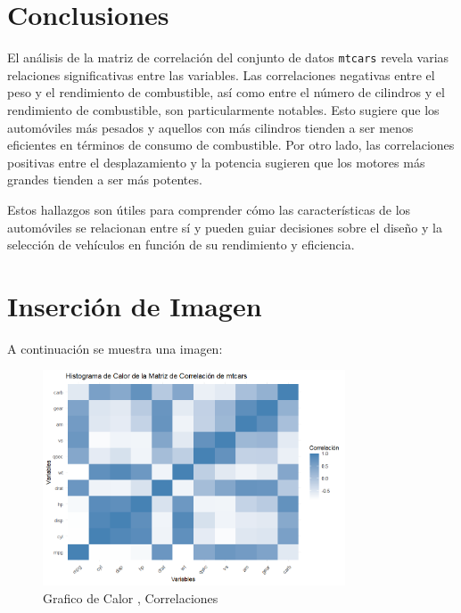 \documentclass{article}
\begin{document}
\section{Conclusiones}
El análisis de la matriz de correlación del conjunto de datos \texttt{mtcars} revela varias relaciones significativas entre las variables. Las correlaciones negativas entre el peso y el rendimiento de combustible, así como entre el número de cilindros y el rendimiento de combustible, son particularmente notables. Esto sugiere que los automóviles más pesados y aquellos con más cilindros tienden a ser menos eficientes en términos de consumo de combustible. Por otro lado, las correlaciones positivas entre el desplazamiento y la potencia sugieren que los motores más grandes tienden a ser más potentes.

Estos hallazgos son útiles para comprender cómo las características de los automóviles se relacionan entre sí y pueden guiar decisiones sobre el diseño y la selección de vehículos en función de su rendimiento y eficiencia.
\section{Inserción de Imagen}
A continuación se muestra una imagen:

\begin{figure}[h] %
	\centering %
	\includegraphics[width=0.8\textwidth]{imagen.png}
	\caption{Grafico de Calor , Correlaciones } %
	\label{fig:mi_imagen} %
\end{figure}
\end{document}
